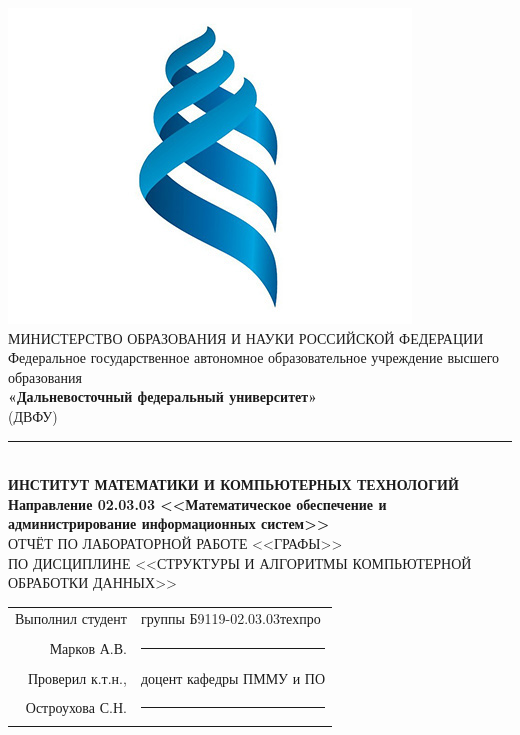 \documentclass[a4paper]{article}
\newcommand{\group}{Б9119-02.03.03техпро}
\newcommand{\teachertitle}{доцент кафедры ПММУ и ПО}
\begin{document}
	\thispagestyle{fancy}

	\begin{center}
		\includegraphics[scale=0.15]{fefu-logo} \\
		\MakeUppercase{Министерство образования и науки Российской Федерации} \\
		Федеральное государственное автономное образовательное учреждение высшего образования \\
		\textbf{«Дальневосточный федеральный университет»} \\ (ДВФУ) \\
		\noindent\rule{\textwidth}{1pt} \\ [0.5cm]
		\textbf{
			\MakeUppercase{Институт математики и компьютерных технологий} \\ [0.5cm]
            Направление 02.03.03 <<Математическое обеспечение и администрирование информационных систем>>
		} \\ [1cm]
		\MakeUppercase{
			Отчёт по лабораторной работе <<Графы>> \\ [0.5cm]
			по дисциплине <<Структуры и алгоритмы компьютерной обработки данных>> 
		} \\ [4cm]
	\end{center}

	\begin{flushright}
		\begin{tabular}{rl}
			Выполнил студент & группы \group                               \\ [0.1cm]
			Марков А.В.      & \rule{\widthof\teachertitle}{0.15mm} \\ [0.1cm]
			Проверил к.т.н., & \teachertitle                        \\ [0.1cm]
			Остроухова С.Н.  & \rule{\widthof\teachertitle}{0.15mm} \\
		\end{tabular}
	\end{flushright}
\end{document}
